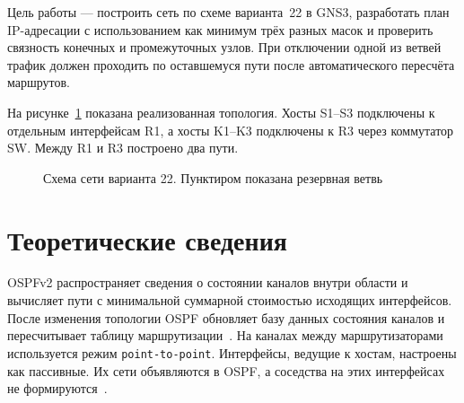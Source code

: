 \documentclass[a4paper,14pt]{extarticle}
\begin{document}
Цель работы --- построить сеть по схеме варианта~22 в GNS3, разработать план
IP-адресации с использованием как минимум трёх разных масок и проверить
связность конечных и промежуточных узлов. При отключении одной из ветвей
трафик должен проходить по оставшемуся пути после автоматического
пересчёта маршрутов.

На рисунке~\ref{fig:topology} показана реализованная топология. Хосты S1--S3
подключены к отдельным интерфейсам R1, а хосты K1--K3 подключены к R3
через коммутатор SW. Между R1 и R3 построено два пути.

\begin{figure}[htbp]
  \centering
  \caption{Схема сети варианта 22. Пунктиром показана резервная ветвь}
  \label{fig:topology}
\end{figure}

\section{Теоретические сведения}

OSPFv2 распространяет сведения о состоянии каналов внутри области и
вычисляет пути с минимальной суммарной стоимостью исходящих
интерфейсов. После изменения топологии OSPF обновляет базу данных
состояния каналов и пересчитывает таблицу маршрутизации~\cite{rfc2328}.
На каналах между маршрутизаторами используется режим
\texttt{point-to-point}. Интерфейсы, ведущие к хостам, настроены как
пассивные. Их сети объявляются в OSPF, а соседства на этих интерфейсах
не формируются~\cite{cisco-ospf}.
\end{document}
